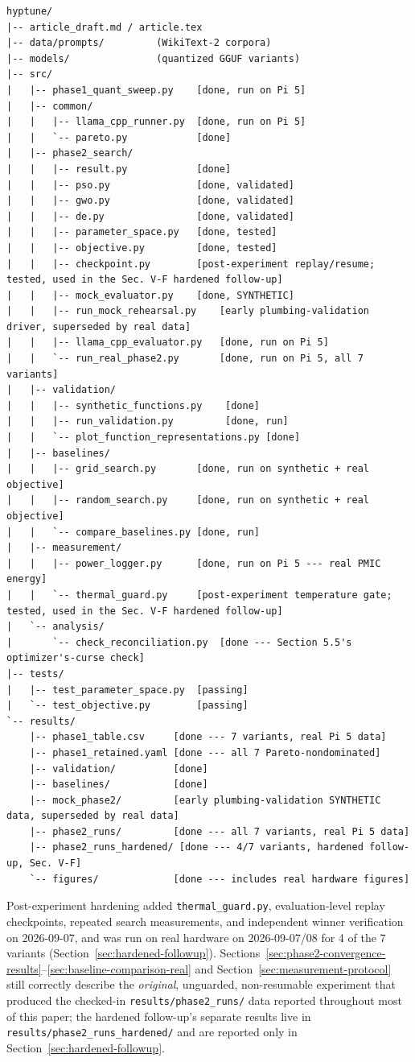 \documentclass[journal]{IEEEtran}
\begin{document}
{\scriptsize
\begin{verbatim}
hyptune/
|-- article_draft.md / article.tex
|-- data/prompts/         (WikiText-2 corpora)
|-- models/               (quantized GGUF variants)
|-- src/
|   |-- phase1_quant_sweep.py    [done, run on Pi 5]
|   |-- common/
|   |   |-- llama_cpp_runner.py  [done, run on Pi 5]
|   |   `-- pareto.py            [done]
|   |-- phase2_search/
|   |   |-- result.py            [done]
|   |   |-- pso.py               [done, validated]
|   |   |-- gwo.py               [done, validated]
|   |   |-- de.py                [done, validated]
|   |   |-- parameter_space.py   [done, tested]
|   |   |-- objective.py         [done, tested]
|   |   |-- checkpoint.py        [post-experiment replay/resume; tested, used in the Sec. V-F hardened follow-up]
|   |   |-- mock_evaluator.py    [done, SYNTHETIC]
|   |   |-- run_mock_rehearsal.py    [early plumbing-validation driver, superseded by real data]
|   |   |-- llama_cpp_evaluator.py   [done, run on Pi 5]
|   |   `-- run_real_phase2.py       [done, run on Pi 5, all 7 variants]
|   |-- validation/
|   |   |-- synthetic_functions.py    [done]
|   |   |-- run_validation.py         [done, run]
|   |   `-- plot_function_representations.py [done]
|   |-- baselines/
|   |   |-- grid_search.py       [done, run on synthetic + real objective]
|   |   |-- random_search.py     [done, run on synthetic + real objective]
|   |   `-- compare_baselines.py [done, run]
|   |-- measurement/
|   |   |-- power_logger.py      [done, run on Pi 5 --- real PMIC energy]
|   |   `-- thermal_guard.py     [post-experiment temperature gate; tested, used in the Sec. V-F hardened follow-up]
|   `-- analysis/
|       `-- check_reconciliation.py  [done --- Section 5.5's optimizer's-curse check]
|-- tests/
|   |-- test_parameter_space.py  [passing]
|   `-- test_objective.py        [passing]
`-- results/
    |-- phase1_table.csv     [done --- 7 variants, real Pi 5 data]
    |-- phase1_retained.yaml [done --- all 7 Pareto-nondominated]
    |-- validation/          [done]
    |-- baselines/           [done]
    |-- mock_phase2/         [early plumbing-validation SYNTHETIC data, superseded by real data]
    |-- phase2_runs/         [done --- all 7 variants, real Pi 5 data]
    |-- phase2_runs_hardened/ [done --- 4/7 variants, hardened follow-up, Sec. V-F]
    `-- figures/             [done --- includes real hardware figures]
\end{verbatim}
}

Post-experiment hardening added \texttt{thermal\_guard.py}, evaluation-level replay checkpoints, repeated search measurements, and independent winner verification on 2026-09-07, and was run on real hardware on 2026-09-07/08 for 4 of the 7 variants (Section~\ref{sec:hardened-followup}). Sections~\ref{sec:phase2-convergence-results}--\ref{sec:baseline-comparison-real} and Section~\ref{sec:measurement-protocol} still correctly describe the \emph{original}, unguarded, non-resumable experiment that produced the checked-in \texttt{results/phase2\_runs/} data reported throughout most of this paper; the hardened follow-up's separate results live in \texttt{results/phase2\_runs\_hardened/} and are reported only in Section~\ref{sec:hardened-followup}.
\end{document}
